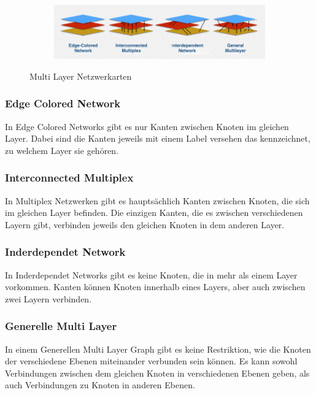 \begin{figure}
  \centering
  \begin{subfigure}[b]{1.0\textwidth}
    \includegraphics[width=1.0\linewidth]{img/network_types.png}
  \end{subfigure}
  \caption{Multi Layer Netzwerkarten}
  \label{network_types}
\end{figure}

\subsubsection{Edge Colored Network}

In Edge Colored Networks gibt es nur Kanten zwischen Knoten im gleichen Layer. Dabei sind die Kanten jeweils mit einem Label versehen das kennzeichnet, zu welchem Layer sie gehören.


\subsubsection{Interconnected Multiplex}

In Multiplex Netzwerken gibt es hauptsächlich Kanten zwischen Knoten, die sich im gleichen Layer befinden. Die einzigen Kanten, die es zwischen verschiedenen Layern gibt, verbinden jeweils den gleichen Knoten in dem anderen Layer. 

\subsubsection{Inderdependet Network}

In Inderdependet Networks gibt es keine Knoten, die in mehr als einem Layer vorkommen. Kanten können Knoten innerhalb eines Layers, aber auch zwischen zwei Layern verbinden.

\subsubsection{Generelle Multi Layer}
In einem Generellen Multi Layer Graph gibt es keine Restriktion, wie die Knoten der verschiedene Ebenen miteinander verbunden sein können. Es kann sowohl Verbindungen zwischen dem gleichen Knoten in verschiedenen Ebenen geben, als auch Verbindungen zu Knoten in anderen Ebenen.


